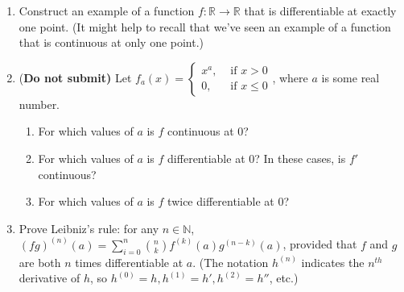 \documentclass[letterpaper,12pt]{article}
\newcommand{\R}{\mathbb{R}}
\newcommand{\N}{\mathbb{N}}
\begin{document}
\begin{enumerate}
 \item Construct an example of a function $f:\R\to\R$ that is differentiable at exactly one point. (It might help to recall that we've seen an example of a function that is continuous at only one point.)
 \item ({\bf Do not submit)} Let $f_a(x) = \begin{cases} x^a, & \text{ if } x> 0\\ 0, & \text{ if } x\leq 0\end{cases}$, where $a$ is some real number.
\begin{enumerate}
 \item For which values of $a$ is $f$ continuous at 0?
 \item For which values of $a$ is $f$ differentiable at 0? In these cases, is $f'$ continuous?
 \item For which values of $a$ is $f$ twice differentiable at 0?
\end{enumerate}
\item Prove Leibniz's rule: for any $n\in\N$, $\displaystyle (fg)^{(n)}(a) = \sum_{i=0}^n {n \choose k}f^{(k)}(a)g^{(n-k)}(a)$, provided that $f$ and $g$ are both $n$ times differentiable at $a$. (The notation $h^{(n)}$ indicates the $n^{th}$ derivative of $h$, so $h^{(0)}=h, h^{(1)} = h', h^{(2)} = h''$, etc.) 


\end{enumerate}
\end{document}
